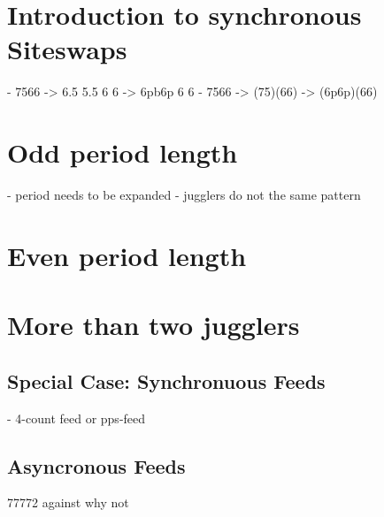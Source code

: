 \documentclass[a4paper,12pt,parskip=full]{scrreprt}
\begin{document}
	\section{Introduction to synchronous Siteswaps}
	- 7566  ->  6.5  5.5  6  6  -> 6pb6p 6 6
	- 7566  -> (75)(66) -> (6p6p)(66)
	\section{Odd period length}
	- period needs to be expanded
	- jugglers do not the same pattern
	
	\section{Even period length}
	\section{More than two jugglers}
	\subsection{Special Case: Synchronuous Feeds}
	- 4-count feed or pps-feed
	\subsection{Asyncronous Feeds}
	77772 against why not
\end{document}
